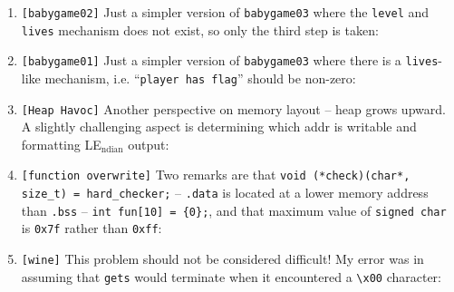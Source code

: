 \documentclass[main.tex]{subfiles}
\begin{document}
\begin{minipage}[t]{0.49\textwidth}
	\setlength{\parskip}{1em}
	\begin{enumerate}
		\item[\texttt{[\_]}] \texttt{[babygame02]} Just a simpler version of \texttt{babygame03} where the \texttt{level} and \texttt{lives} mechanism does not exist, so only the third step is taken:\\[0.3em]
		\item[\texttt{[\_]}] \texttt{[babygame01]} Just a simpler version of \texttt{babygame03} where there is a \texttt{lives}-like mechanism, i.e. ``\texttt{player has flag}'' should be non-zero:\\[0.3em]
		\item[\texttt{[\_]}] \texttt{[Heap Havoc]} Another perspective on memory layout -- heap grows upward. A slightly challenging aspect is determining which addr is writable and formatting LE$_{\text{ndian}}$ output: \\[0.3em]
		\item[\texttt{[\_]}] \texttt{[function overwrite]} Two remarks are that \texttt{void (*check)(char*, size\_t) = hard\_checker;} -- \texttt{.data} is located at a lower memory address than \texttt{.bss} -- \texttt{int fun[10] = \{0\};}, and that maximum value of \texttt{signed char} is \texttt{0x7f} rather than \texttt{0xff}: \\[0.3em]
		\item[\texttt{[\_]}] \texttt{[wine]} This problem should not be considered difficult! My error was in assuming that \texttt{gets} would terminate when it encountered a \texttt{{\textbackslash}x00} character: \\[0.3em]
	\end{enumerate}
\end{minipage}
\end{document}
